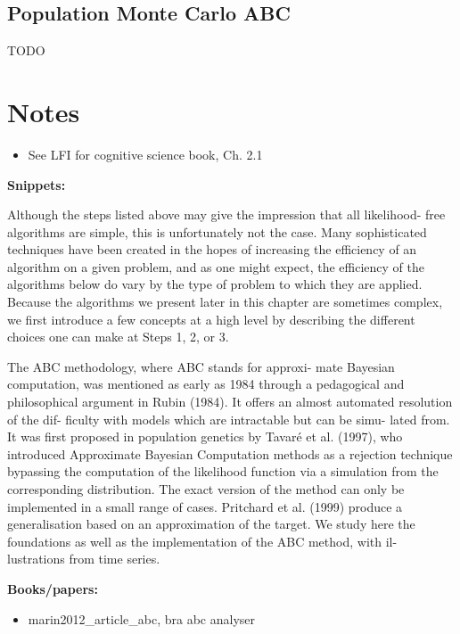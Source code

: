 \subsection{Population Monte Carlo ABC}\label{sec:pmc_abc}

TODO

\section{Notes}

\begin{itemize}
    \item See LFI for cognitive science book, Ch. 2.1
\end{itemize}

\textbf{Snippets:}

Although the steps listed above may give the impression that all likelihood- free algorithms are simple, this is unfortunately not the case. Many sophisticated techniques have been created in the hopes of increasing the efficiency of an algorithm on a given problem, and as one might expect, the efficiency of the algorithms below do vary by the type of problem to which they are applied. Because the algorithms we present later in this chapter are sometimes complex, we first introduce a few concepts at a high level by describing the different choices one can make at Steps 1, 2, or 3. 

The ABC methodology, where ABC stands for approxi- mate Bayesian computation, was mentioned as early as 1984 through a pedagogical and philosophical argument in Rubin (1984). It offers an almost automated resolution of the dif- ficulty with models which are intractable but can be simu- lated from. It was first proposed in population genetics by Tavaré et al. (1997), who introduced Approximate Bayesian Computation methods as a rejection technique bypassing the computation of the likelihood function via a simulation from the corresponding distribution. The exact version of the method can only be implemented in a small range of cases. Pritchard et al. (1999) produce a generalisation based on an approximation of the target. We study here the foundations as well as the implementation of the ABC method, with il- lustrations from time series. 

\textbf{Books/papers:} 

\begin{itemize}
    \item marin2012\_article\_abc, bra abc analyser 
\end{itemize}

